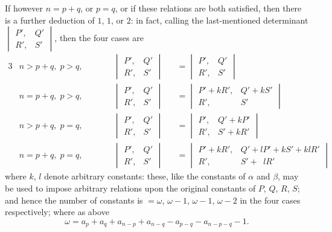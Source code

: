 \documentclass[11pt,a4paper]{book}
\begin{document}
If however $n=p+q$, or $p=q$, or if these relations are both satisfied, then there is a further deduction of $1$, $1$, or $2$: in fact, calling the last-mentioned determinant $\begin{vmatrix} P', & Q' \\ R', & S' \end{vmatrix}$, then the four cases are
\begin{alignat*}{3}
&n > p+q,\; p > q,\qquad
&&\begin{vmatrix} P', & Q' \\ R', & S' \end{vmatrix}
&&=\begin{vmatrix} P', & Q' \\ R', & S' \end{vmatrix}\\[0.5em]
&n = p+q,\; p > q,\qquad
&&\begin{vmatrix} P', & Q' \\ R', & S' \end{vmatrix}
&&=\begin{vmatrix} P'+kR', & Q'+kS' \\ R', & S' \end{vmatrix}\\[0.5em]
&n > p+q,\; p = q,\qquad
&&\begin{vmatrix} P', & Q' \\ R', & S' \end{vmatrix}
&&=\begin{vmatrix} P', & Q'+kP' \\ R', & S'+kR' \end{vmatrix}\\[0.5em]
&n = p+q,\; p = q,\qquad
&&\begin{vmatrix} P', & Q' \\ R', & S' \end{vmatrix}
&&=\begin{vmatrix} P'+kR', & Q'+lP'+kS'+klR' \\ R', & S'+\phantom{k}lR' \end{vmatrix}
\end{alignat*}
where $k$, $l$ denote arbitrary constants: these, like the constants of $\alpha$ and $\beta$, may be used to impose arbitrary relations upon the original constants of $P$, $Q$, $R$, $S$; and hence the number of constants is $=\omega$, $\omega-1$, $\omega-1$, $\omega-2$ in the four cases respectively; where as above
\[
\omega = a_p+a_q+a_{n-p}+a_{n-q}-a_{p-q}-a_{n-p-q}-1.
\]
\end{document}
